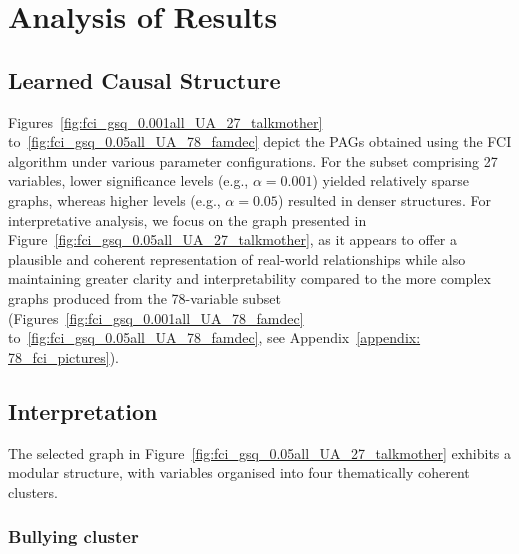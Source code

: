 \documentclass[main.tex]{subfiles}
\begin{document}
\section{Analysis of Results}

\subsection{Learned Causal Structure}
% 
% 
Figures~\ref{fig:fci_gsq_0.001all_UA_27_talkmother} to~\ref{fig:fci_gsq_0.05all_UA_78_famdec} depict the PAGs obtained using the FCI algorithm under various parameter configurations. For the subset comprising 27 variables, lower significance levels (e.g., $\alpha = 0.001$) yielded relatively sparse graphs, whereas higher levels (e.g., $\alpha = 0.05$) resulted in denser structures. For interpretative analysis, we focus on the graph presented in Figure~\ref{fig:fci_gsq_0.05all_UA_27_talkmother}, as it appears to offer a plausible and coherent representation of real-world relationships while also maintaining greater clarity and interpretability compared to the more complex graphs produced from the 78-variable subset (Figures~\ref{fig:fci_gsq_0.001all_UA_78_famdec} to~\ref{fig:fci_gsq_0.05all_UA_78_famdec}, see Appendix~\ref{appendix: 78_fci_pictures}).






\subsection{Interpretation}

The selected graph in Figure~\ref{fig:fci_gsq_0.05all_UA_27_talkmother} exhibits a modular structure, with variables organised into four thematically coherent clusters.
\subsubsection*{Bullying cluster}
\end{document}
